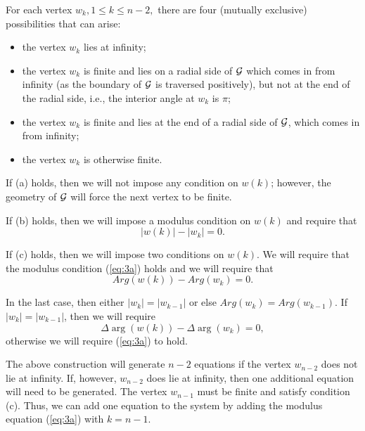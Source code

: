 \documentclass[12pt]{article}%
\begin{document}
For each vertex $w_k , 1 \leq k \leq n-2,$ there are four (mutually
exclusive) possibilities that can arise: 
\begin{itemize}
\item[(a)] the vertex $w_k$  lies at infinity;
\item[(b)] the vertex $w_k$ is finite and lies on a radial side of
${\cal G}$ which comes in from infinity (as the boundary of ${\cal
G}$ is traversed positively), but not at the end of the radial side,
i.e., the interior angle at $w_k$ is $\pi$;  
\item[(c)] the vertex $w_k$ is finite and lies at the end of a radial
side of ${\cal G}$, which comes in from infinity;
\item[(d)] the vertex $w_k$ is otherwise finite.
\end{itemize}

If (a) holds, then we will not impose any condition on $w(k)$;
however, the geometry of ${\cal G}$ will force the next vertex to be
finite.

If (b) holds, then we will impose a modulus condition on $w(k)$ and
require that
\renewcommand{\theequation}{3a}
\begin{equation}
|w(k)| - |w_k| = 0.\label{eq:3a}\end{equation}

If (c) holds, then we will impose two conditions on $w(k)$.  We will
require that the modulus condition (\ref{eq:3a}) holds and we will
require that
\renewcommand{\theequation}{3b}
\begin{equation}
Arg (w(k)) - Arg (w_k) =0.\label{eq:3b}\end{equation}

In the last case, then either $|w_k| = |w_{k-1}|$ or else $Arg
(w_k) = Arg (w_{k-1})$.  If $|w_k| = |w_{k-1}|$, then we will
require
\renewcommand{\theequation}{3c}
\begin{equation}
\Delta \arg (w(k)) - \Delta \arg (w_k) = 0,\label{eq:3c}\end{equation}
\setcounter{equation}{3}otherwise we will require (\ref{eq:3a}) to
hold.

The above construction will generate $n-2$ equations if the vertex
$w_{n-2}$ does not lie at infinity.  If, however, $w_{n-2}$ does lie
at infinity, then one additional equation will need to be generated.
The vertex $w_{n-1}$ must be finite and satisfy condition
(c).  Thus, we can add one equation to the system by adding
the modulus equation (\ref{eq:3a}) with $k = n-1$.
\end{document}

